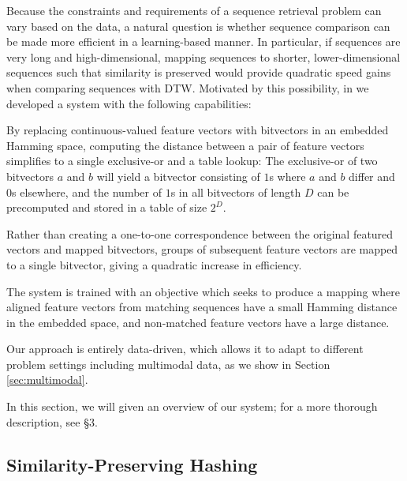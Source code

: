 \documentclass{article} %
\begin{document}
Because the constraints and requirements of a sequence retrieval problem can vary based on the data, a natural question is whether sequence comparison can be made more efficient in a learning-based manner.
In particular, if sequences are very long and high-dimensional, mapping sequences to shorter, lower-dimensional sequences such that similarity is preserved would provide quadratic speed gains when comparing sequences with DTW.
Motivated by this possibility, in \cite{raffel2015large} we developed a system with the following capabilities:
\begin{description}[topsep=1pt,itemsep=-1pt,leftmargin=10pt]
\item[Maps to a Hamming space:] By replacing continuous-valued feature vectors with bitvectors in an embedded Hamming space, computing the distance between a pair of feature vectors simplifies to a single exclusive-or and a table lookup: The exclusive-or of two bitvectors $a$ and $b$ will yield a bitvector consisting of $1$s where $a$ and $b$ differ and $0$s elsewhere, and the number of $1$s in all bitvectors of length $D$ can be precomputed and stored in a table of size $2^D$.  
\item[Downsamples sequences:] Rather than creating a one-to-one correspondence between the original featured vectors and mapped bitvectors, groups of subsequent feature vectors are mapped to a single bitvector, giving a quadratic increase in efficiency.
\item[Preserves similarity:] The system is trained with an objective which seeks to produce a mapping where aligned feature vectors from matching sequences have a small Hamming distance in the embedded space, and non-matched feature vectors have a large distance.
\item[Learns its representation:] Our approach is entirely data-driven, which allows it to adapt to different problem settings including multimodal data, as we show in Section \ref{sec:multimodal}.
\end{description}

In this section, we will given an overview of our system; for a more thorough description, see \cite{raffel2015large} \S3.

\subsection{Similarity-Preserving Hashing}
\end{document}
